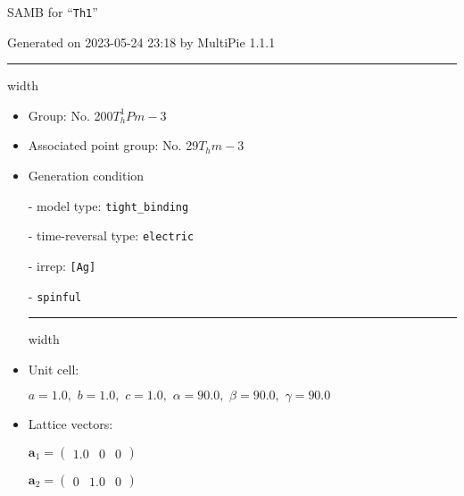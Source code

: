 \documentclass[fleqn,10pt,landscape]{article}
\begin{document}
\setcounter{MaxMatrixCols}{16}

\setlength{\baselineskip}{16pt}
\footnotesize
\begin{center}
\LARGE
SAMB for ``\texttt{Th1}''
\end{center}
\begin{flushright}
Generated on 2023-05-24 23:18 by MultiPie 1.1.1
\end{flushright}
\vspace{1cm}


 \hfil \hrule height 1mm width \textwidth \hfil

\begin{itemize}
\item Group: No. 200\quad$T_{h}^{1}$\quad$Pm-3$\quad[ cubic ]

\item Associated point group: No. 29\quad$T_{h}$\quad$m-3$\quad[ cubic ]

\vspace{5mm}

\item Generation condition

\quad - model type: \texttt{tight_binding}

\quad - time-reversal type: \texttt{electric}

\quad - irrep: \texttt{[Ag]}

\quad - \texttt{spinful}


 \hfil \hrule height 1mm width \textwidth \hfil

\item Unit cell:

\quad $a=1.0,\,\, b=1.0,\,\, c=1.0,\,\, \alpha=90.0,\,\, \beta=90.0,\,\, \gamma=90.0$

\item Lattice vectors:

\quad $\bm{a}_1=\begin{pmatrix} 1.0 & 0 & 0 \end{pmatrix}$

\quad $\bm{a}_2=\begin{pmatrix} 0 & 1.0 & 0 \end{pmatrix}$


\end{itemize}
\end{document}
